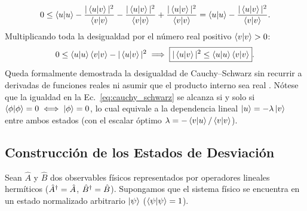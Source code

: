 \begin{equation}
    0 \le \left\langle u \middle| u \right\rangle - \frac{|\left\langle u \middle| v \right\rangle|^2}{\left\langle v \middle| v \right\rangle} - \frac{|\left\langle u \middle| v \right\rangle|^2}{\left\langle v \middle| v \right\rangle} + \frac{|\left\langle u \middle| v \right\rangle|^2}{\left\langle v \middle| v \right\rangle} = \left\langle u \middle| u \right\rangle - \frac{|\left\langle u \middle| v \right\rangle|^2}{\left\langle v \middle| v \right\rangle}.
\end{equation}
Multiplicando toda la desigualdad por el número real positivo $\left\langle v \middle| v \right\rangle > 0$:
\begin{equation}
    0 \le \left\langle u \middle| u \right\rangle\left\langle v \middle| v \right\rangle - |\left\langle u \middle| v \right\rangle|^2 \implies \boxed{|\left\langle u \middle| v \right\rangle|^2 \le \left\langle u \middle| u \right\rangle\left\langle v \middle| v \right\rangle}.
\end{equation}
Queda formalmente demostrada la desigualdad de Cauchy--Schwarz sin recurrir a derivadas de funciones reales ni asumir que el producto interno sea real \cite{sakurai}. Nótese que la igualdad en la Ec.~\eqref{eq:cauchy_schwarz} se alcanza si y solo si $\left\langle \phi \middle| \phi \right\rangle = 0 \iff \left| \phi \right\rangle = 0$, lo cual equivale a la dependencia lineal $\left| u \right\rangle = -\lambda\left| v \right\rangle$ entre ambos estados (con el escalar óptimo $\lambda = -\left\langle v \middle| u \right\rangle/\left\langle v \middle| v \right\rangle$).



\subsection{Construcción de los Estados de Desviación}

Sean $\hat{A}$ y $\hat{B}$ dos observables físicos representados por operadores lineales hermíticos ($\hat{A}^\dagger = \hat{A}$, $\hat{B}^\dagger = \hat{B}$). Supongamos que el sistema físico se encuentra en un estado normalizado arbitrario $\left| \psi \right\rangle$ ($\left\langle \psi \middle| \psi \right\rangle=1$).

